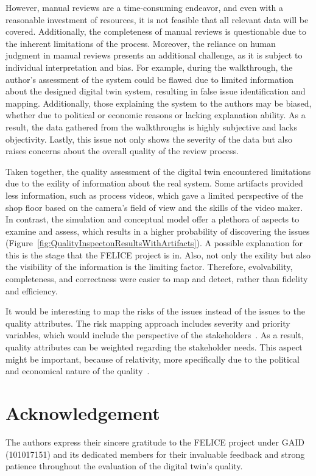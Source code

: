 \documentclass{llncs}
\begin{document}
    However, manual reviews are a time-consuming endeavor, and even with a reasonable investment of resources, it is not feasible that all relevant data will be covered. 
    Additionally, the completeness of manual reviews is questionable due to the inherent limitations of the process. 
    Moreover, the reliance on human judgment in manual reviews presents an additional challenge, as it is subject to individual interpretation and bias.  
    For example, during the walkthrough, the author's assessment of the system could be flawed due to limited information about the designed digital twin system, resulting in false 
    issue identification and mapping. Additionally, those explaining the system to the authors may be biased, 
    whether due to political or economic reasons or lacking explanation ability. As a result, the data gathered from the walkthroughs is highly subjective and lacks objectivity. Lastly, this issue not only shows the severity of the data but also raises concerns about 
    the overall quality of the review process.

    Taken together, the quality assessment of the digital twin encountered limitations due to the exility of information about the real system. 
    Some artifacts provided less information, such as process videos, which gave a limited perspective of the shop floor based on the camera's 
    field of view and the skills of the video maker. In contrast, the simulation and conceptual model offer a plethora of aspects to examine and assess, 
    which results in a higher probability of discovering the issues (Figure~\ref{fig:QualityInspectonResultsWithArtifacts}). 
    A possible explanation for this is the stage that the FELICE project is in. Also, not only the exility but also the visibility of the information is the limiting factor. 
    Therefore, evolvability, completeness, and correctness were easier to map and detect, rather than fidelity and efficiency. 

    It would be interesting to map the risks of the issues instead of the issues to the quality attributes. 
    The risk mapping approach includes severity and priority variables, which would include the perspective of the stakeholders~\cite{CemKanerSoftwareTesting,ISO/IEC/IEEE29119}.
    As a result, quality attributes can be weighted regarding the stakeholder needs. This aspect might be important, because of relativity, 
    more specifically due to the political and economical nature of the quality~\cite{SystemQuality}. 
   
    \section*{Acknowledgement}
    The authors express their sincere gratitude to the FELICE project under GAID (101017151) and its dedicated members 
    for their invaluable feedback and strong patience throughout the evaluation of the digital twin's quality.
    
    

    
\end{document}
